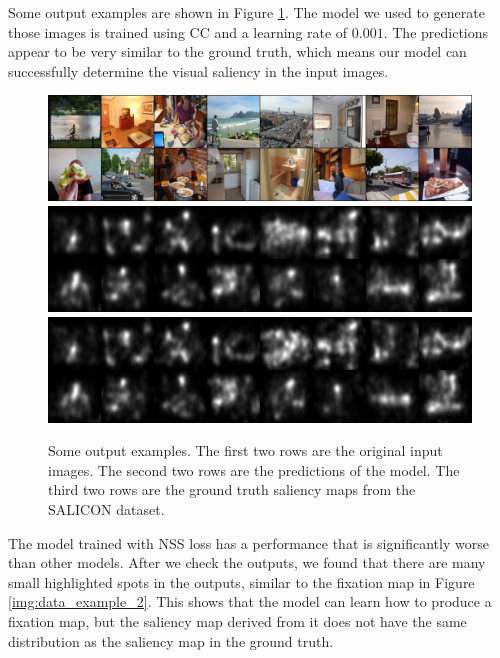 \documentclass[12pt]{article}
\begin{document}
Some output examples are shown in Figure \ref{img:output_example}. The model we used to generate those images is trained using CC and a learning rate of $0.001$. The predictions appear to be
very similar to the ground truth, which means our model can successfully determine the visual saliency
in the input images.

\begin{figure}[h!]
    \centering
    \includegraphics[width=\textwidth]{imgs/out_original_image.png}
    \includegraphics[width=\textwidth]{imgs/out_prediction.png}
    \includegraphics[width=\textwidth]{imgs/out_groundtruth.png}
    \caption{Some output examples. The first two rows are the original input images.
    The second two rows are the predictions of the model. The third two rows are the
    ground truth saliency maps from the SALICON dataset.}
    \label{img:output_example}
\end{figure}

The model trained with NSS loss has a performance that is significantly worse than other models.
After we check the outputs, we found that there are many small highlighted spots in the outputs, similar to the fixation map in Figure \ref{img:data_example_2}.
This shows that the model can learn how to produce a fixation map, but the saliency map derived from it does not have the same distribution as the saliency map in the ground truth.
\end{document}
